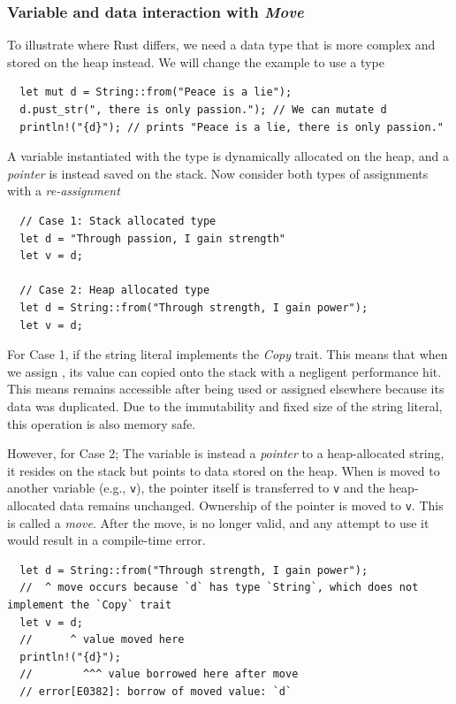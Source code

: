 \documentclass[twoside,11pt]{report}
\theoremstyle{definition}
\theoremstyle{plain}
\begin{document}
\subsubsection*{Variable and data interaction with \textit{Move}}

To illustrate where Rust differs, we need a data type that is more complex and stored on the heap instead. We will change the example to use a  type
\begin{verbatim}
  let mut d = String::from("Peace is a lie");
  d.pust_str(", there is only passion."); // We can mutate d
  println!("{d}"); // prints "Peace is a lie, there is only passion."
\end{verbatim}
A variable instantiated with the  type is dynamically allocated on the heap, and a \textit{pointer} is instead saved on the stack. Now consider both types of assignments with a \textit{re-assignment}
\begin{verbatim}
  // Case 1: Stack allocated type
  let d = "Through passion, I gain strength"
  let v = d;

  // Case 2: Heap allocated type
  let d = String::from("Through strength, I gain power");
  let v = d;
\end{verbatim}

For Case 1, if the string literal  implements the \textit{Copy} trait. This means that when we assign , its value can copied onto the stack with a negligent performance hit. This means  remains accessible after being used or assigned elsewhere because its data was duplicated. Due to the immutability and fixed size of the string literal, this operation is also memory safe.

However, for Case 2; The variable  is instead a \textit{pointer} to a heap-allocated string, it resides on the stack but points to data stored on the heap. When  is moved to another variable (e.g., \texttt{v}), the pointer itself is transferred to \texttt{v} and the heap-allocated data remains unchanged. Ownership of the pointer is moved to \texttt{v}. This is called a \textit{move}. After the move,  is no longer valid, and any attempt to use it would result in a compile-time error.
\begin{verbatim}
  let d = String::from("Through strength, I gain power");
  //  ^ move occurs because `d` has type `String`, which does not implement the `Copy` trait
  let v = d;
  //      ^ value moved here
  println!("{d}"); 
  //        ^^^ value borrowed here after move
  // error[E0382]: borrow of moved value: `d`
\end{verbatim}
\end{document}
